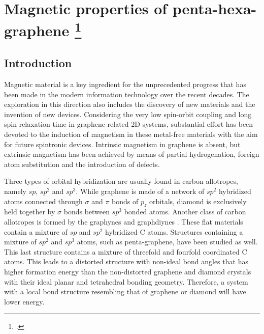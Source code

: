 \section[Magnetic properties of penta-hexa-graphene]{Magnetic properties of penta-hexa-graphene \footcite[This work is published in:][]{Aierken2016.magnetism}}

\subsection{Introduction}

Magnetic material is a key ingredient for the unprecedented progress that has been made in the modern information technology over the recent decades. The exploration in this direction also includes the discovery of new materials and the invention of new devices. Considering the very low spin-orbit coupling and long spin relaxation time in graphene-related 2D systems, substantial effort has been devoted to the induction of magnetism in these metal-free materials with the aim for future spintronic devices\cite{KAN2008,Kun2015}. Intrinsic magnetism in graphene is absent, but extrinsic magnetism has been achieved by means of partial hydrogenation\cite{Zhou2009,Eng2013}, foreign atom substitution\cite{Okada2001,Miao2016} and the introduction of defects\cite{Pereira2006,Yazyev2007}. 

Three types of orbital hybridization are usually found in carbon allotropes, namely $sp$, $sp^2$ and $sp^3$.  While graphene is made of a network of $sp^2$ hybridized atoms connected through $\sigma$ and $\pi$ bonds of $p_z$ orbitals, diamond is exclusively held together by $\sigma$ bonds between $sp^3$ bonded atoms. Another class of carbon allotropes is formed by the graphynes and graphdiynes
\cite{Baughman1987,Ivanovskii20131}. These flat materials contain a mixture of $sp$ and $sp^2$ hybridized C atoms. Structures containing a mixture of $sp^2$ and $sp^3$ atoms, such as penta-graphene\cite{Zhang2015}, have been studied\cite{Wang2016424,Yu2015,Berdiyorov2016} as well. This last structure contains a mixture of threefold and fourfold coordinated C atoms. This leads to a distorted structure with non-ideal bond angles that has higher formation energy than the non-distorted graphene and diamond crystals with their ideal planar and tetrahedral bonding geometry. Therefore, a system with a local bond structure resembling that of graphene or diamond will have lower energy. 

